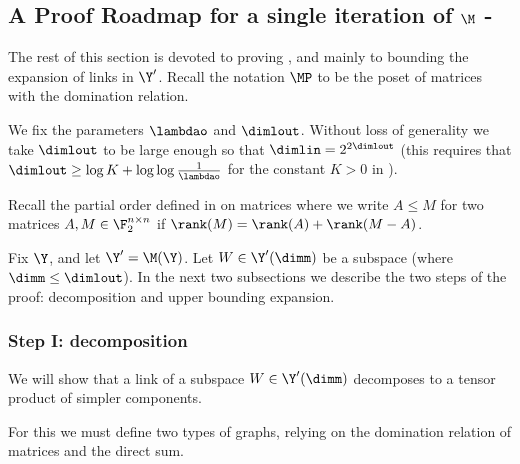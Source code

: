 \subsection[A Proof roadmap for a single iteration]{A Proof Roadmap for a single iteration of \(\M\) - } \label{sec:proof-roadmap}
The rest of this section is devoted to proving , and mainly to bounding the expansion of links in \(\Y'\). Recall the notation \(\MP\) to be the poset of matrices with the domination relation.

We fix the parameters \(\lambdao\) and \(\dimlout\). Without loss of generality we take \(\dimlout\) to be large enough so that \(\dimlin = 2^{2\dimlout}\) (this requires that \(\dimlout \geq \log K + \log \log \frac{1}{\lambdao}\) for the constant \(K > 0\) in ). %

Recall the partial order defined in  on matrices where we write \(A \leq M\) for two matrices \(A,M \in \F_2^{n \times n}\) if \(\rank(M) = \rank(A) + \rank(M-A)\). 

\medskip

Fix \(\Y\), and let \(\Y' = \M(\Y)\). Let \(W \in \Y'(\dimm)\) be a subspace (where \(\dimm \leq \dimlout\)).  %
In the next two subsections we describe the two steps of the proof: decomposition and upper bounding expansion.
\subsubsection{Step I: decomposition}
We will show that a link of a subspace \(W \in \Y'(\dimm)\) decomposes to a tensor product of simpler components. %

For this we must define two types of graphs, relying on the domination relation of matrices and the direct sum.
\def\under{\mathcal{T}}
\def\disjointgraph{\mathcal{H}}

